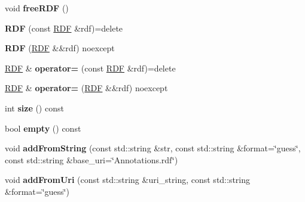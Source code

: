 \begin{DoxyCompactItemize}
\item 
\mbox{\label{classomexmeta_1_1RDF_add8f3d957f24a26785f29b85d50f4399}} 
void {\bfseries free\+R\+DF} ()
\item 
\mbox{\label{classomexmeta_1_1RDF_ad95c4a8588988efe399c7f984e304990}} 
{\bfseries R\+DF} (const \hyperlink{classomexmeta_1_1RDF}{R\+DF} \&rdf)=delete
\item 
\mbox{\label{classomexmeta_1_1RDF_a6490b2ea0d10e3026bea587a305b7fb9}} 
{\bfseries R\+DF} (\hyperlink{classomexmeta_1_1RDF}{R\+DF} \&\&rdf) noexcept
\item 
\mbox{\label{classomexmeta_1_1RDF_a9d1b20d798969d3c1dac412c621247b9}} 
\hyperlink{classomexmeta_1_1RDF}{R\+DF} \& {\bfseries operator=} (const \hyperlink{classomexmeta_1_1RDF}{R\+DF} \&rdf)=delete
\item 
\mbox{\label{classomexmeta_1_1RDF_ae3739bda3be0986547c31559381f3df4}} 
\hyperlink{classomexmeta_1_1RDF}{R\+DF} \& {\bfseries operator=} (\hyperlink{classomexmeta_1_1RDF}{R\+DF} \&\&rdf) noexcept
\item 
\mbox{\label{classomexmeta_1_1RDF_a63247bb3a05957abf7320c060543c3ca}} 
int {\bfseries size} () const
\item 
\mbox{\label{classomexmeta_1_1RDF_ab6525e8db606ffd48425b05ad2a204d8}} 
bool {\bfseries empty} () const
\item 
\mbox{\label{classomexmeta_1_1RDF_a4294d4ef2f2c7bafa9c90def27b6abf7}} 
void {\bfseries add\+From\+String} (const std\+::string \&str, const std\+::string \&format=\char`\"{}guess\char`\"{}, const std\+::string \&base\+\_\+uri=\char`\"{}Annotations.\+rdf\char`\"{})
\item 
\mbox{\label{classomexmeta_1_1RDF_af99201be3782319d32e963ca7bed5b2b}} 
void {\bfseries add\+From\+Uri} (const std\+::string \&uri\+\_\+string, const std\+::string \&format=\char`\"{}guess\char`\"{})
\item 
\mbox{\label{classomexmeta_1_1RDF_ac88eeb1a0f6911a2c1e4c43cef1b9047}} 

\end{DoxyCompactItemize}
